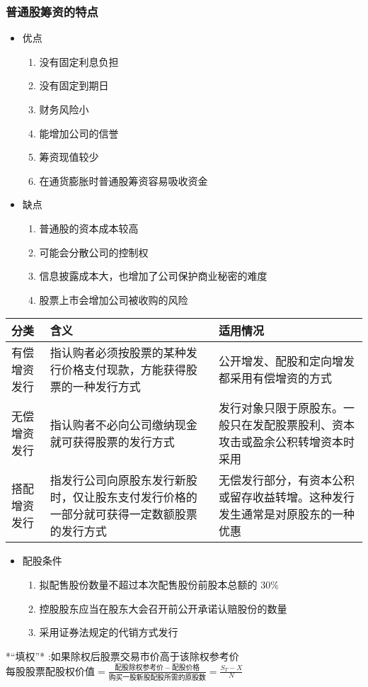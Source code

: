 \documentclass[11pt]{article}
\begin{document}
\subsubsection{普通股筹资的特点}
\label{sec:orgeb4799a}
\begin{itemize}
\item 优点
\begin{enumerate}
\item 没有固定利息负担
\item 没有固定到期日
\item 财务风险小
\item 能增加公司的信誉
\item 筹资现值较少
\item 在通货膨胀时普通股筹资容易吸收资金
\end{enumerate}
\item 缺点
\begin{enumerate}
\item 普通股的资本成本较高
\item 可能会分散公司的控制权
\item 信息披露成本大，也增加了公司保护商业秘密的难度
\item 股票上市会增加公司被收购的风险
\end{enumerate}
\end{itemize}
\begin{center}
\begin{tabular}{lll}
分类 & 含义 & 适用情况\\
\hline
有偿增资发行 & 指认购者必须按股票的某种发行价格支付现款，方能获得股票的一种发行方式 & 公开增发、配股和定向增发都采用有偿增资的方式\\
无偿增资发行 & 指认购者不必向公司缴纳现金就可获得股票的发行方式 & 发行对象只限于原股东。一般只在发配股票股利、资本攻击或盈余公积转增资本时采用\\
搭配增资发行 & 指发行公司向原股东发行新股时，仅让股东支付发行价格的一部分就可获得一定数额股票的发行方式 & 无偿发行部分，有资本公积或留存收益转增。这种发行发生通常是对原股东的一种优惠\\
\end{tabular}
\end{center}
\begin{itemize}
\item 配股条件
\begin{enumerate}
\item 拟配售股份数量不超过本次配售股份前股本总额的 30\%
\item 控股股东应当在股东大会召开前公开承诺认赔股份的数量
\item 采用证券法规定的代销方式发行
\end{enumerate}
\end{itemize}
*``填权''* :如果除权后股票交易市价高于该除权参考价
\(每股股票配股权价值 = \frac{配股除权参考价 - 配股价格}{购买一股新股配股所需的原股数}=\frac{S_{T}-X}{N}\)
\end{document}

